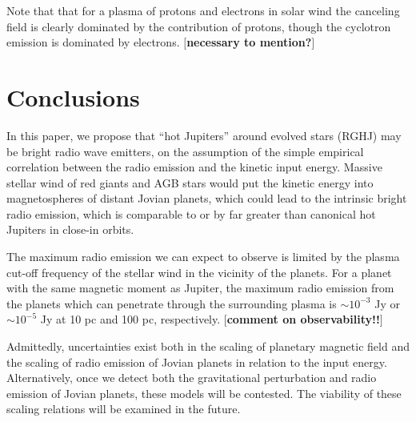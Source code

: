 \documentclass{emulateapj}
\def\memoYF#1{\color{red}$[${\bf #1}$]$ \color{black}}
\begin{document}

Note that that for a plasma of protons and electrons in solar wind the canceling field is clearly dominated by the contribution of protons, though the cyclotron emission is dominated by electrons. \memoYF{necessary to mention?}



\section{Conclusions}
\label{sec:conc}

In this paper, we propose that ``hot Jupiters'' around evolved stars (RGHJ) may be bright radio wave emitters, on the assumption of the simple empirical correlation between the radio emission and the kinetic input energy. 
Massive stellar wind of red giants and AGB stars would put the kinetic energy into magnetospheres of distant Jovian planets, which could lead to the intrinsic bright radio emission, which is comparable to or by far greater than canonical hot Jupiters in close-in orbits. 

The maximum radio emission we can expect to observe is limited by the plasma cut-off frequency of the stellar wind in the vicinity of the planets. 
For a planet with the same magnetic moment as Jupiter, the maximum radio emission from the planets which can penetrate through the surrounding plasma is $\sim 10^{-3}$ Jy or $\sim 10^{-5}$ Jy at 10 pc and 100 pc, respectively. 
\memoYF{comment on observability!!}

Admittedly, uncertainties exist both in the scaling of planetary magnetic field  and the scaling of radio emission of Jovian planets in relation to the input energy. 
Alternatively, once we detect both the gravitational perturbation and radio emission of Jovian planets, these models will be contested. The viability of these scaling relations will be examined in the future. 


\vspace{0.5in}

\end{document}
